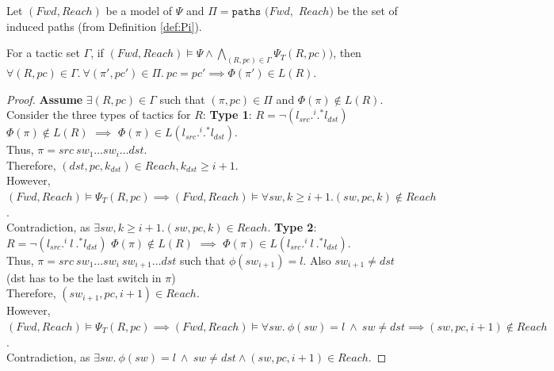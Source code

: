 %
Let $(Fwd, Reach)$ be a model of $\Psi$ and 
$\Pi = \texttt{paths}$ $(Fwd,$ $Reach)$ be the set
of induced paths (from Definition \ref{def:Pi}).
\begin{theorem}[Soundness]
	For a tactic set $\Gamma$, if $(Fwd, Reach) \models \Psi \wedge \bigwedge\limits_{(R, pc) \in \Gamma} \Psi_T(R,pc)) $, 
	then $\forall (R, pc) \in \Gamma. ~\forall(\pi', pc') \in \Pi. ~pc = pc' \implies \Phi(\pi') \in L(R)$.
\end{theorem}
\iffull
\begin{proof}
	\textbf{Assume} $\exists (R,pc) \in \Gamma$ such that $(\pi, pc) \in \Pi$ and $\Phi(\pi) \not\in L(R)$.
	Consider the three types of tactics for $R$: \newline
	\textbf{Type 1}: $R = \neg (l_{src} .^i .^* l_{dst})$ \\
	$\Phi(\pi) \not\in L(R)$ $\implies$ $\Phi(\pi) \in L(l_{src} .^i .^* l_{dst})$. \\
	Thus, $\pi = src\ sw_1 \ldots sw_i \ldots dst$. \\
	Therefore,  $(dst, pc, k_{dst}) \in Reach, k_{dst} \geq i + 1$. \\
	However, $(Fwd, Reach) \models \Psi_T(R, pc) \implies (Fwd, Reach) \models \forall sw,k \geq i + 1. (sw,pc,k) \notin Reach$.\\
	Contradiction, as $\exists sw, k \geq i + 1. (sw,pc,k) \in Reach$.
	\newline
	\newline
	\textbf{Type 2}: $R = \neg (l_{src} .^i \ l \ .^* l_{dst})$ \newline
	$\Phi(\pi) \not\in L(R)$ $\implies$ $\Phi(\pi) \in L (l_{src} .^i \ l \ .^* l_{dst})$. \\
	Thus, $\pi = src\ sw_1 \ldots sw_i \ sw_{i+1} \ldots dst$ such that $\phi(sw_{i+1}) = l$. Also $sw_{i+1} \not=dst$ (dst has to be the last switch in $\pi$)\\
	Therefore,  $(sw_{i+1}, pc, i+1) \in Reach$. \\
	However,
	$(Fwd, Reach) \models \Psi_T(R, pc) \implies (Fwd, Reach) \models \forall sw.~ \phi(sw) = l ~\wedge~ sw \not= dst \implies  (sw, pc, i + 1) \notin Reach$. \\
	Contradiction, as $\exists sw. ~ \phi(sw) = l ~\wedge~ sw \not= dst \wedge (sw,pc,i+1) \in Reach$.

\end{proof}
